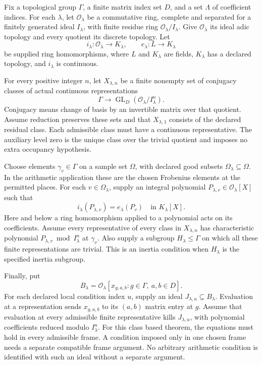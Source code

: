 \documentclass[11pt]{amsart}
\theoremstyle{definition}
\theoremstyle{remark}
\newcommand{\OO}{\mathcal O}
\newcommand{\GL}{\operatorname{GL}}
\begin{document}
Fix a topological group \(\Gamma\), a finite matrix index set \(D\), and a set \(\Lambda\) of coefficient indices. For each \(\lambda\), let \(\OO_\lambda\) be a commutative ring, complete and separated for a finitely generated ideal \(I_\lambda\), with finite residue ring \(\OO_\lambda/I_\lambda\). Give \(\OO_\lambda\) its ideal adic topology and every quotient its discrete topology. Let
\[
i_\lambda:\OO_\lambda\longrightarrow K_\lambda,
\qquad e_\lambda:L\longrightarrow K_\lambda
\]
be supplied ring homomorphisms, where \(L\) and \(K_\lambda\) are fields, \(K_\lambda\) has a declared topology, and \(i_\lambda\) is continuous.

For every positive integer \(n\), let \(X_{\lambda,n}\) be a finite nonempty set of conjugacy classes of actual continuous representations
\[
\Gamma\longrightarrow\GL_D(\OO_\lambda/I_\lambda^n).
\]
Conjugacy means change of basis by an invertible matrix over that quotient. Assume reduction preserves these sets and that \(X_{\lambda,1}\) consists of the declared residual class. Each admissible class must have a continuous representative. The auxiliary level zero is the unique class over the trivial quotient and imposes no extra occupancy hypothesis.

Choose elements \(\gamma_v\in\Gamma\) on a sample set \(\Omega\), with declared good subsets \(\Omega_\lambda\subseteq\Omega\). In the arithmetic application these are the chosen Frobenius elements at the permitted places. For each \(v\in\Omega_\lambda\), supply an integral polynomial \(P_{\lambda,v}\in\OO_\lambda[X]\) such that
\[
i_\lambda(P_{\lambda,v})=e_\lambda(P_v)\quad\text{in }K_\lambda[X].
\]
Here and below a ring homomorphism applied to a polynomial acts on its coefficients. Assume every representative of every class in \(X_{\lambda,n}\) has characteristic polynomial \(P_{\lambda,v}\bmod I_\lambda^n\) at \(\gamma_v\). Also supply a subgroup \(H_\lambda\leq\Gamma\) on which all these finite representations are trivial. This is an inertia condition when \(H_\lambda\) is the specified inertia subgroup.

Finally, put
\[
B_\lambda=\OO_\lambda[x_{g,a,b}:g\in\Gamma,\ a,b\in D].
\]
For each declared local condition index \(u\), supply an ideal \(J_{\lambda,u}\subseteq B_\lambda\). Evaluation at a representation sends \(x_{g,a,b}\) to its \((a,b)\) matrix entry at \(g\). Assume that evaluation at every admissible finite representative kills \(J_{\lambda,u}\), with polynomial coefficients reduced modulo \(I_\lambda^n\). For this class based theorem, the equations must hold in every admissible frame. A condition imposed only in one chosen frame needs a separate compatible frame argument. No arbitrary arithmetic condition is identified with such an ideal without a separate argument.
\end{document}
